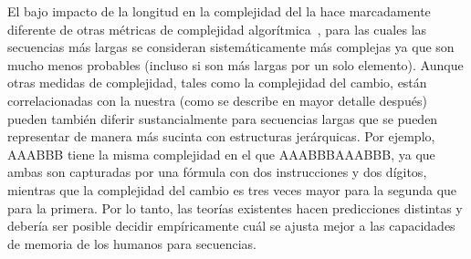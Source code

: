 El bajo impacto de la longitud en la complejidad del \lot la hace marcadamente diferente de otras métricas de complejidad algorítmica~\cite{f43,f44,f46}, para las cuales las secuencias más largas se consideran sistemáticamente más complejas ya que son mucho menos probables (incluso si son más largas por un solo elemento). Aunque otras medidas de complejidad, tales como la complejidad del cambio, están correlacionadas con la nuestra (como se describe en mayor detalle después) pueden también diferir sustancialmente para secuencias largas que se pueden representar de manera más sucinta con estructuras jerárquicas. Por ejemplo, AAABBB tiene la misma complejidad en el \lot que AAABBBAAABBB, ya que ambas son capturadas por una fórmula con dos instrucciones y dos dígitos, mientras que la complejidad del cambio es tres veces mayor para la segunda que para la primera. Por lo tanto, las teorías existentes hacen predicciones distintas y debería ser posible decidir empíricamente cuál se ajusta mejor a las capacidades de memoria de los humanos para secuencias. 





